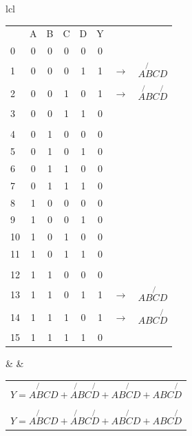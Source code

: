\vspace{1em}
\Solution
\begin{tabular}{lcl}
   \begin{adjustbox}{valign=t}
      \begin{tabularx}{7cm}{l|C|C|C|C|C|cl}
         & A & B & C & D & Y \\
         0 & 0 & 0 & 0 & 0 & 0 \\
         1 & 0 & 0 & 0 & 1 & 1
         & $\to$ & $\not{ABC}D$ \\
         2 & 0 & 0 & 1 & 0 & 1 
         & $\to$ & $\not{AB}C\not{D}$ \\
         3 & 0 & 0 & 1 & 1 & 0 \\
         \\
         4 & 0 & 1 & 0 & 0 & 0 \\
         5 & 0 & 1 & 0 & 1 & 0 \\
         6 & 0 & 1 & 1 & 0 & 0 \\
         7 & 0 & 1 & 1 & 1 & 0 \\
         8 & 1 & 0 & 0 & 0 & 0 \\
         9 & 1 & 0 & 0 & 1 & 0 \\
         10 & 1 & 0 & 1 & 0 & 0 \\
         11 & 1 & 0 & 1 & 1 & 0 \\
         \\
         12 & 1 & 1 & 0 & 0 & 0 \\
         13 & 1 & 1 & 0 & 1 & 1
         & $\to$ & $AB\not{C}D$ \\
         14 & 1 & 1 & 1 & 0 & 1
         & $\to$ & $ABC\not{D}$ \\
         15 & 1 & 1 & 1 & 1 & 0 \\
      \end{tabularx}
   \end{adjustbox}
   & \hspace{2cm} &
   \begin{adjustbox}{valign=t}
      \begin{tabular}{l}
         $Y = \not{ABC}D + \not{AB}C\not{D} + AB\not{C}D + ABC\not{D}$\\[2em]
         \begin{Karnaugh}
            \minterms{1,2,13,14}
            \implicant{1}{1}
            \implicant{2}{2}
            \implicant{13}{13}
            \implicant{14}{14}
         \end{Karnaugh}\\
         $Y = \not{ABC}D + \not{AB}C\not{D} + AB\not{C}D + ABC\not{D}$
      \end{tabular}
   \end{adjustbox}
\end{tabular}











